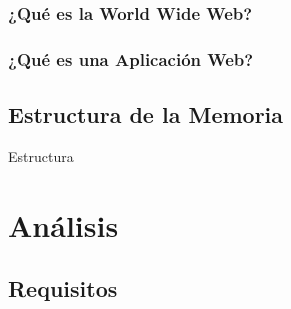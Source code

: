 \documentclass[a4paper]{report}
\begin{document}
    \subsubsection{¿Qué es la World Wide Web?}
    
    \subsubsection{¿Qué es una Aplicación Web?}

    \subsection{Estructura de la Memoria}
    Estructura

    \section{Análisis}

        \subsection{Requisitos}
\end{document}
